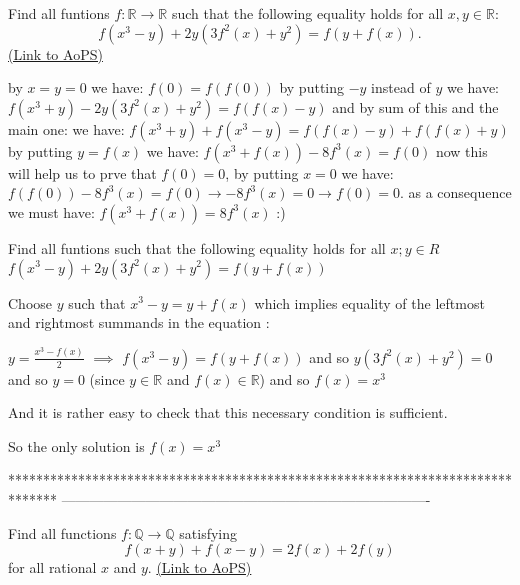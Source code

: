 \begin{problem}
	Find all funtions $f: \mathbb R \to \mathbb R$ such that the following equality holds for all $ x,y \in \mathbb R$:
\[f(x^{3}-y)+2y(3f^{2}(x)+y^{2})=f(y+f(x)).\]
	\flushright \href{https://artofproblemsolving.com/community/c6h159278}{(Link to AoPS)}
\end{problem}



\begin{mysolution}
by $ x=y=0$ we have: $ f(0)=f(f(0))$
by putting $ -y$ instead of $ y$ we have: 
$ f(x^{3}+y)-2y\left(3f^{2}(x)+y^{2}\right)=f(f(x)-y)$ and by sum of this and the main one:
we have: $ f(x^{3}+y)+f(x^{3}-y)=f(f(x)-y)+f(f(x)+y)$
by putting $ y=f(x)$ we have:
$ f(x^{3}+f(x))-8f^{3}(x)=f(0)$
now this will help us to prve that $ f(0)=0$, by putting $ x=0$ we have: $ f(f(0))-8f^{3}(x)=f(0)\rightarrow-8f^{3}(x)=0\rightarrow f(0)=0$.
as a consequence we must have:
$ f(x^{3}+f(x))=8f^{3}(x)$ 
 :) 

\end{mysolution}



\begin{mysolution}
	\begin{tcolorbox}Find all funtions such that the following equality holds for all $ x;y \in R$
$ f(x^{3}-y)+2y(3f^{2}(x)+y^{2})=f(y+f(x))$\end{tcolorbox}

Choose $ y$ such that $ x^{3}-y=y+f(x)$ which implies equality of the leftmost and rightmost summands in the equation :

$ y=\frac{x^{3}-f(x)}{2}$ $ \implies$ $ f(x^{3}-y)=f(y+f(x))$ and so $ y(3f^{2}(x)+y^{2})=0$ and so $ y=0$ (since $ y\in\mathbb{R}$ and $ f(x)\in\mathbb{R}$) and so $ f(x)=x^{3}$

And it is rather easy to check that this necessary condition is sufficient.

So the only solution is $ f(x)=x^{3}$
\end{mysolution}
*******************************************************************************
-------------------------------------------------------------------------------

\begin{problem}
	Find all functions $f: \mathbb Q \to \mathbb Q$ satisfying \[f(x+y)+f(x-y)=2f(x)+2f(y)\] for all rational $ x$ and $ y$.
	\flushright \href{https://artofproblemsolving.com/community/c6h159376}{(Link to AoPS)}
\end{problem}




